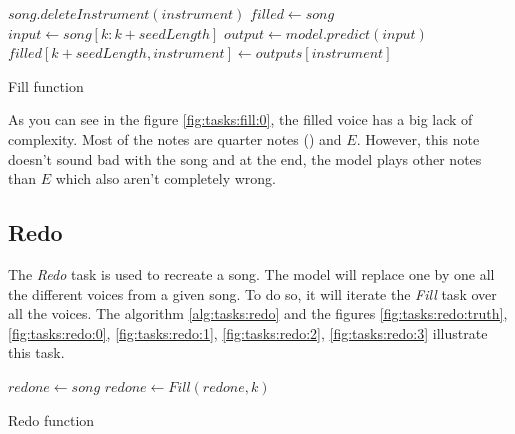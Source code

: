 \documentclass[12pt]{report}
\begin{document}
\begin{algorithm}
    \begin{algorithmic}[1]
        \Statex
            \State $song.deleteInstrument(instrument)$
            \State $filled \gets song$
                \State $input \gets song[k:k + seedLength]$
                \State $output \gets model.predict(input)$
                \State $filled[k + seedLength, instrument] \gets outputs[instrument]$
            \EndFor
            \State {}
        \EndFunction
        \end{algorithmic}
    \caption{Fill function}
    \label{alg:tasks:fill}
\end{algorithm}

As you can see in the figure \ref{fig:tasks:fill:0}, the filled voice has a big lack of complexity.
Most of the notes are quarter notes (\musQuarter) and $E$.
However, this note doesn't sound bad with the song and at the end, the model plays other notes than $E$ which also aren't completely wrong.

\subsection{Redo}
\label{sec:tasks:redo}

The \textit{Redo} task is used to recreate a song.
The model will replace one by one all the different voices from a given song.
To do so, it will iterate the \textit{Fill} task over all the voices.
The algorithm \ref{alg:tasks:redo} and the figures \ref{fig:tasks:redo:truth}, \ref{fig:tasks:redo:0}, \ref{fig:tasks:redo:1}, \ref{fig:tasks:redo:2}, \ref{fig:tasks:redo:3} illustrate this task.

\begin{algorithm}
    \begin{algorithmic}[1]
        \Statex
            \State $redone \gets song$
                \State $redone \gets Fill(redone, k)$
            \EndFor
            \State {}
        \EndFunction
        \end{algorithmic}
    \caption{Redo function}
    \label{alg:tasks:redo}
\end{algorithm}
\end{document}
